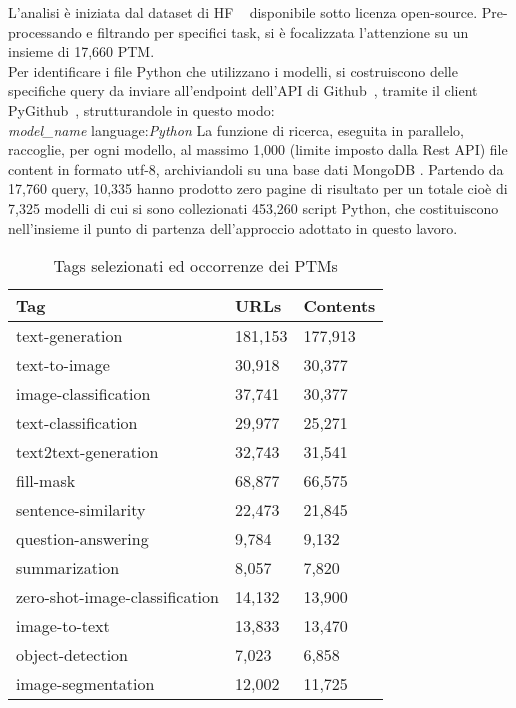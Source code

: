 \documentclass{article}
\begin{document}
L'analisi è iniziata dal dataset di HF ~\cite{ait_hfcommunity_2023} disponibile sotto licenza open-source. Pre-processando e filtrando per specifici task, si è focalizzata l'attenzione su un insieme di 17,660 PTM.\\
Per identificare i file Python che utilizzano i modelli, si costruiscono delle specifiche query da inviare all'endpoint dell'API di Github~\cite{github_rest}, tramite il client PyGithub~\cite{pygithub}, strutturandole in questo modo:\\
\emph{model\_name} language:\emph{Python}
La funzione di ricerca, eseguita in parallelo, raccoglie, per ogni modello, al massimo 1,000 (limite imposto dalla Rest API) file content in formato utf-8, archiviandoli su una base dati MongoDB \cite{pymongo}. 
Partendo da 17,760 query, 10,335 hanno prodotto zero pagine di risultato per un totale cioè di 7,325 modelli di cui si sono collezionati 453,260 script Python, che costituiscono nell'insieme il punto di partenza dell'approccio adottato in questo lavoro.
\begin{table}[htbp]
\small
    \centering    
    \caption{Tags selezionati ed occorrenze dei PTMs}
    \label{tab:tags2}
    \begin{tabular}{|l|l|l|}
    \hline
            Tag & URLs & Contents \\ \hline
            text-generation & 181,153 & 177,913\\ 
            text-to-image & 30,918 & 30,377\\ 
            image-classification & 37,741 & 30,377\\ 
            text-classification & 29,977 & 25,271\\ 
            text2text-generation & 32,743 & 31,541\\ 
            fill-mask & 68,877 & 66,575\\ 
            sentence-similarity & 22,473 & 21,845\\ 
            question-answering & 9,784 & 9,132\\ 
            summarization & 8,057 & 7,820\\ 
            zero-shot-image-classification & 14,132 & 13,900\\ 
            image-to-text & 13,833 & 13,470\\ 
            object-detection & 7,023 & 6,858\\ 
            image-segmentation & 12,002 & 11,725\\ \hline
    \end{tabular}
\end{table}
\end{document}
